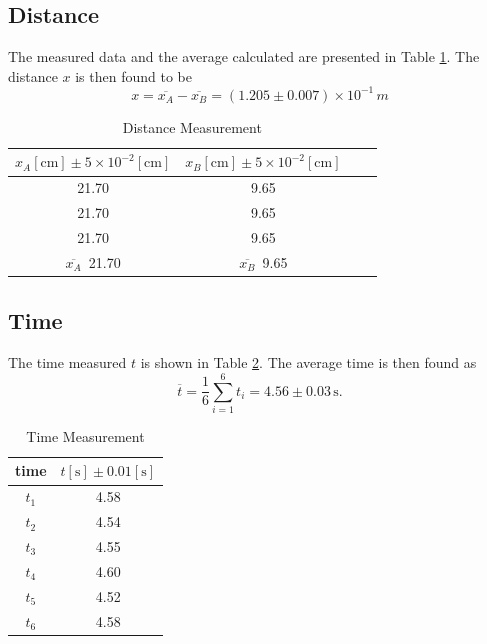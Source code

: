 \documentclass[a4paper]{article}
\begin{document}
	\subsection{Distance}
The measured data and the average calculated are presented in Table \ref{Tab.distance}. The distance $x$ is then found to be
\[x = \overline{x_A} - \overline{x_B} = (1.205 \pm 0.007) \times 10^{-1}\,m \]
\begin{table}[htbp]
\centering
\begin{tabular}{cccc}
\toprule
$x_A [\text{cm}] \pm 5\times 10^{-2} [\text{cm}]$  & $x_B [\text{cm}] \pm 5\times 10^{-2} [\text{cm}]$ \\
\hline
21.70 & 9.65 \\
21.70 & 9.65 \\
21.70 & 9.65 \\
\hline
$\overline{x_A}\,$  21.70 & $\overline{x_B}\,$  9.65 \\
\bottomrule
\end{tabular}
\caption{Distance Measurement}\label{Tab.distance}
\end{table}




	\subsection{Time}
The time measured $t$ is shown in Table \ref{Tab.time}. The average time is then found as
\[\overline{t} = \frac{1}{6} \sum \limits_{i=1}^{6} t_i = 4.56 \pm 0.03 \,\text{s}.\]
\begin{table}[htbp]
\centering
\begin{tabular}{cc}
\toprule
time & $t [\text{s}] \pm 0.01 [\text{s}]$\\
\midrule
$t_1$ & 4.58\\
$t_2$ & 4.54\\
$t_3$ & 4.55\\
$t_4$ & 4.60\\
$t_5$ & 4.52\\
$t_6$ & 4.58\\
\bottomrule
\end{tabular}
\caption{Time Measurement}\label{Tab.time}
\end{table}
\end{document}
